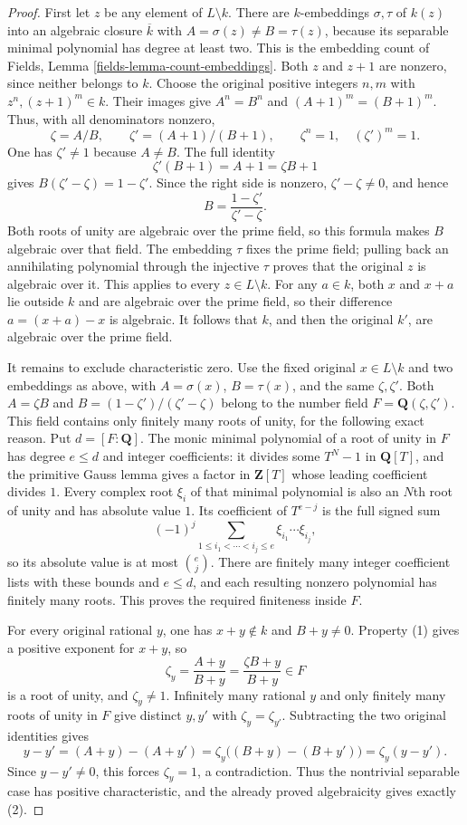 \begin{proof}
First let $z$ be any element of $L\setminus k$.
There are $k$-embeddings $\sigma,\tau$ of
$k(z)$ into an algebraic closure $\overline k$
with $A=\sigma(z)\neq B=\tau(z)$, because
its separable minimal polynomial has
degree at least two. This is the
embedding count of Fields, Lemma
\ref{fields-lemma-count-embeddings}.
Both $z$ and $z+1$ are nonzero, since
neither belongs to $k$. Choose the
original positive integers $n,m$ with
$z^n,(z+1)^m\in k$. Their images give
$A^n=B^n$ and $(A+1)^m=(B+1)^m$.
Thus, with all denominators nonzero,
$$
\zeta=A/B,\qquad \zeta'=(A+1)/(B+1),
\qquad \zeta^n=1,\quad(\zeta')^m=1.
$$
One has $\zeta'\neq1$ because $A\neq B$.
The full identity
$$
\zeta'(B+1)=A+1=\zeta B+1
$$
gives $B(\zeta'-\zeta)=1-\zeta'$.
Since the right side is nonzero,
$\zeta'-\zeta\neq0$, and hence
$$
B=\frac{1-\zeta'}{\zeta'-\zeta}.
$$
Both roots of unity are algebraic over
the prime field, so this formula makes
$B$ algebraic over that field. The
embedding $\tau$ fixes the prime field;
pulling back an annihilating polynomial
through the injective $\tau$ proves that
the original $z$ is algebraic over it.
This applies to every $z\in L\setminus k$.
For any $a\in k$, both $x$ and $x+a$
lie outside $k$ and are algebraic over
the prime field, so their difference
$a=(x+a)-x$ is algebraic. It follows
that $k$, and then the original $k'$,
are algebraic over the prime field.

It remains to exclude characteristic
zero. Use the fixed original $x\in L\setminus k$
and two embeddings as above, with
$A=\sigma(x)$, $B=\tau(x)$, and the
same $\zeta,\zeta'$. Both $A=\zeta B$
and $B=(1-\zeta')/(\zeta'-\zeta)$
belong to the number field
$F=\mathbf Q(\zeta,\zeta')$.
This field contains only finitely many
roots of unity, for the following exact
reason. Put $d=[F:\mathbf Q]$. The monic
minimal polynomial of a root of unity
in $F$ has degree $e\leq d$ and integer
coefficients: it divides some $T^N-1$
in $\mathbf Q[T]$, and the primitive
Gauss lemma gives a factor in $\mathbf Z[T]$
whose leading coefficient divides $1$.
Every complex root $\xi_i$ of that
minimal polynomial is also an $N$th
root of unity and has absolute value
$1$. Its coefficient of $T^{e-j}$ is
the full signed sum
$$
(-1)^j\sum_{1\leq i_1<\cdots<i_j\leq e}
\xi_{i_1}\cdots\xi_{i_j},
$$
so its absolute value is at most
$\binom ej$. There are finitely many
integer coefficient lists with these
bounds and $e\leq d$, and each resulting
nonzero polynomial has finitely many
roots. This proves the required
finiteness inside $F$.

For every original rational $y$, one
has $x+y\notin k$ and $B+y\neq0$.
Property (1) gives a positive exponent
for $x+y$, so
$$
\zeta_y=\frac{A+y}{B+y}
=\frac{\zeta B+y}{B+y}\in F
$$
is a root of unity, and $\zeta_y\neq1$.
Infinitely many rational $y$ and only
finitely many roots of unity in $F$
give distinct $y,y'$ with
$\zeta_y=\zeta_{y'}$. Subtracting the
two original identities gives
$$
y-y'=(A+y)-(A+y')
=\zeta_y\big((B+y)-(B+y')\big)
=\zeta_y(y-y').
$$
Since $y-y'\neq0$, this forces
$\zeta_y=1$, a contradiction. Thus the
nontrivial separable case has positive
characteristic, and the already proved
algebraicity gives exactly (2).


\end{proof}
